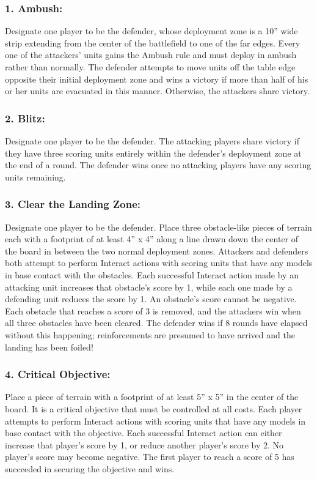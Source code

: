 \begin{multicols}{2}
\subsubsection*{1. Ambush:} Designate one player to be the defender, whose deployment zone is a 10'' wide strip extending from the center of the battlefield to one of the far edges. Every one of the attackers' units gains the Ambush rule and must deploy in ambush rather than normally. The defender attempts to move units off the table edge opposite their initial deployment zone and wins a victory if more than half of his or her units are evacuated in this manner. Otherwise, the attackers share victory.

\subsubsection*{2. Blitz:} Designate one player to be the defender. The attacking players share victory if they have three scoring units entirely within the defender's deployment zone at the end of a round. The defender wins once no attacking players have any scoring units remaining.

\subsubsection*{3. Clear the Landing Zone:} Designate one player to be the defender. Place three obstacle-like pieces of terrain each with a footprint of at least 4'' x 4'' along a line drawn down the center of the board in between the two normal deployment zones. Attackers and defenders both attempt to perform Interact actions with scoring units that have any models in base contact with the obstacles. Each successful Interact action made by an attacking unit increases that obstacle's score by 1, while each one made by a defending unit reduces the score by 1. An obstacle's score cannot be negative. Each obstacle that reaches a score of 3 is removed, and the attackers win when all three obstacles have been cleared. The defender wins if 8 rounds have elapsed without this happening; reinforcements are presumed to have arrived and the landing has been foiled!

\subsubsection*{4. Critical Objective:} Place a piece of terrain with a footprint of at least 5'' x 5'' in the center of the board. It is a critical objective that must be controlled at all costs. Each player attempts to perform Interact actions with scoring units that have any models in base contact with the objective. Each successful Interact action can either increase that player's score by 1, or reduce another player's score by 2. No player's score may become negative. The first player to reach a score of 5 has succeeded in securing the objective and wins.


\end{multicols}
